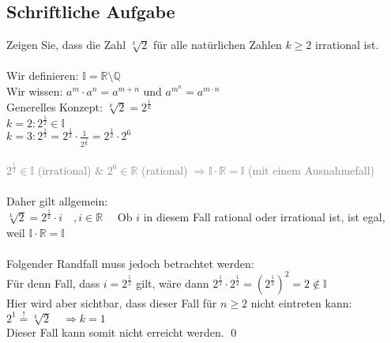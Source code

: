 \documentclass[a4paper]{article}
\begin{document}
\setcounter{section}{1}
\subsection{Schriftliche Aufgabe}
Zeigen Sie, dass die Zahl $\sqrt[k]{2}$ für alle natürlichen Zahlen $k \geq 2$ irrational ist.\\\\
Wir definieren: \(\mathbb{I}=\mathbb{R}\setminus \mathbb{Q}\)\\
Wir wissen: \(a^m\cdot a^n = a^{m+n}\) und \(a^{m^n}=a^{m\cdot n}\)\\
Generelles Konzept: \(\sqrt[k]{2}=2^\frac{1}{k}\)\\
\hspace*{3,56cm}\(k=2: 2^\frac{1}{2} \in \mathbb{I}\)\\
\hspace*{3,56cm}\(k=3: 2^\frac{1}{3}=2^\frac{1}{2}\cdot\frac{1}{2^\frac{1}{6}}=2^\frac{1}{2}\cdot 2^6\)\\\\
\textcolor{gray}{$2^\frac{1}{2} \in \mathbb{I}$ (irrational) \& $2^6 \in \mathbb{R}$ (rational) $\Rightarrow \mathbb{I} \cdot \mathbb{R}=\mathbb{I}$ (mit einem Ausnahmefall)}\\\\
Daher gilt allgemein:\\
$\sqrt[k]{2} = 2^\frac{1}{2} \cdot i \quad, i \in \mathbb{R}\quad$ Ob $i$ in diesem Fall rational oder irrational ist, ist egal, weil $\mathbb{I} \cdot \mathbb{R} = \mathbb{I}$\\\\
Folgender Randfall muss jedoch betrachtet werden:\\
Für denn Fall, dass $i = 2^\frac{1}{2}$ gilt, wäre dann $2^\frac{1}{2} \cdot 2^\frac{1}{2} = (2^\frac{1}{2})^2 = 2 \notin \mathbb{I}$\\
Hier wird aber sichtbar, dass dieser Fall für $n \geq 2$ nicht eintreten kann:\\
$2^1 \overset{!}{=} \sqrt[k]{2} \quad \Rightarrow k = 1$\\
Dieser Fall kann somit nicht erreicht werden. \qed

\bigskip
\end{document}
